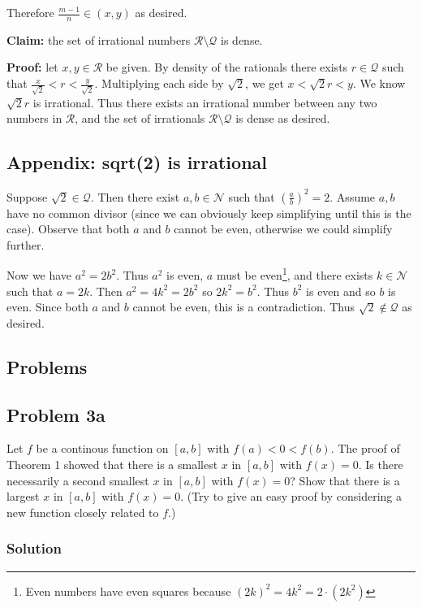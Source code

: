 \vs

Therefore $\frac{m-1}{n}\in(x,y)$ as desired.

\vs

\textbf{Claim:} the set of irrational numbers $\mathcal{R}\setminus\mathcal{Q}$ is dense.

\textbf{Proof:} let $x,y\in\mathcal{R}$ be given. By density of the rationals
there exists $r\in\mathcal{Q}$ such that
$\frac{x}{\sqrt{2}}<r<\frac{y}{\sqrt{2}}$. Multiplying each side by
$\sqrt{2}$, we get $x<\sqrt{2}r<y$. We know $\sqrt{2}r$ is irrational.
Thus there exists an irrational number between any two numbers in
$\mathcal{R}$, and the set of irrationals $\mathcal{R}\setminus\mathcal{Q}$ is dense as desired.

\subsection{Appendix: sqrt(2) is irrational}\label{sqrt2proof}
Suppose $\sqrt{2}\in\mathcal{Q}$. Then there exist $a,b\in\mathcal{N}$ such that
$\left(\frac{a}{b}\right)^{2}=2$. Assume $a, b$ have no common divisor
(since we can obviously keep simplifying until this is the case).
Observe that both $a$ and $b$ cannot be even, otherwise we could
simplify further.

\vs

Now we have $a^{2}=2b^{2}$. Thus $a^{2}$ is even, $a$ must be
even\footnote{Even numbers have even squares because
  ${(2k)}^{2}=4k^{2}=2\cdot(2k^{2})$}, and there exists
$k\in\mathcal{N}$ such that $a=2k$. Then $a^{2}=4k^{2}=2b^{2}$ so
$2k^{2}=b^{2}$. Thus $b^{2}$ is even and so $b$ is even. Since both
$a$ and $b$ cannot be even, this is a contradiction. Thus
$\sqrt{2}\notin\mathcal{Q}$ as desired.

\subsection{Problems}
\subsection*{Problem 3a}
Let $f$ be a continous function on $[a, b]$ with $f(a)<0<f(b)$. The
proof of Theorem 1 showed that there is a smallest $x$ in $[a,b]$ with
$f(x)=0$. Is there necessarily a second smallest $x$ in $[a,b]$ with
$f(x)=0$? Show that there is a largest $x$ in $[a,b]$ with $f(x)=0$.
(Try to give an easy proof by considering a new function closely
related to $f$.)

\subsubsection*{Solution}

